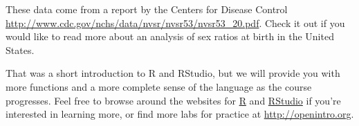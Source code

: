 \documentclass[
]{article}
\begin{document}
These data come from a report by the Centers for Disease Control
\url{http://www.cdc.gov/nchs/data/nvsr/nvsr53/nvsr53_20.pdf}. Check it
out if you would like to read more about an analysis of sex ratios at
birth in the United States.

That was a short introduction to R and RStudio, but we will provide you
with more functions and a more complete sense of the language as the
course progresses. Feel free to browse around the websites for
\href{http://www.r-project.org}{R} and
\href{http://rstudio.org}{RStudio} if you're interested in learning
more, or find more labs for practice at \url{http://openintro.org}.
\end{document}

